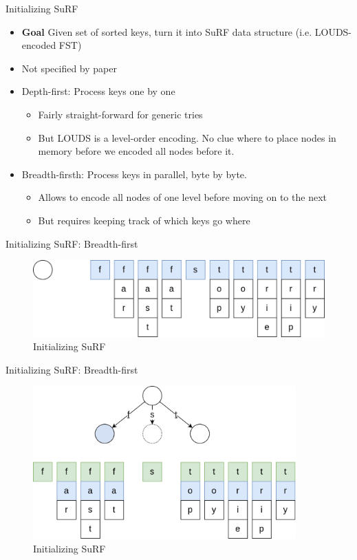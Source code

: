 \documentclass{beamer}
\begin{document}
\begin{frame}{Initializing SuRF}
		\begin{itemize}
				\item \textbf{Goal} Given set of sorted keys, turn it into SuRF
						data structure (i.e. LOUDS-encoded FST)
				\item Not specified by paper
				\item Depth-first: Process keys one by one
						\begin{itemize}
								\item Fairly straight-forward for generic tries
								\item But LOUDS is a level-order encoding. No
										clue where to place nodes in memory
										before we encoded all nodes before it.
						\end{itemize}

				\item Breadth-firsth: Process keys in parallel, byte by byte.
						\begin{itemize}
								\item Allows to encode all nodes of one level
										before moving on to the next
								\item But requires keeping track of which keys
										go where
						\end{itemize}
		\end{itemize}
\end{frame}

\begin{frame}{Initializing SuRF: Breadth-first}
		\begin{figure}
				\centering
				\includegraphics[width=\textwidth]{resources/initializing_surf_1}
				\caption{Initializing SuRF}
		\end{figure}
\end{frame}

\begin{frame}{Initializing SuRF: Breadth-first}
		\begin{figure}
				\centering
				\includegraphics[width=0.9\textwidth]{resources/initializing_surf_2}
				\caption{Initializing SuRF}
		\end{figure}
\end{frame}
\end{document}
